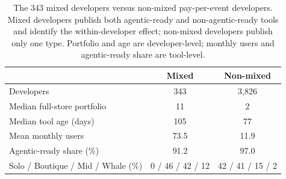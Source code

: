 \begin{table}[t]
  \centering
  \caption{The 343 mixed developers versus non-mixed pay-per-event developers.
    Mixed developers publish both agentic-ready and non-agentic-ready tools and
    identify the within-developer effect; non-mixed developers publish only one
    type. Portfolio and age are developer-level; monthly users and agentic-ready
    share are tool-level.}
  \label{tab:mixed_developers}
  \small
  \begin{tabular}{lcc}
    \toprule
    & \textbf{Mixed} & \textbf{Non-mixed} \\
    \midrule
    Developers & 343 & 3{,}826 \\
    Median full-store portfolio & 11 & 2 \\
    Median tool age (days) & 105 & 77 \\
    Mean monthly users & 73.5 & 11.9 \\
    Agentic-ready share (\%) & 91.2 & 97.0 \\
    Solo / Boutique / Mid / Whale (\%) & 0 / 46 / 42 / 12 & 42 / 41 / 15 / 2 \\
    \bottomrule
  \end{tabular}
\end{table}
